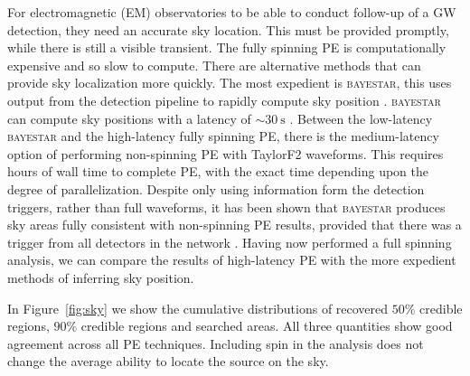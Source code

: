 For electromagnetic (EM) observatories to be able to conduct follow-up of a GW detection, they need an accurate sky location. This must be provided promptly, while there is still a visible transient. The fully spinning PE is computationally expensive and so slow to compute. There are alternative methods that can provide sky localization more quickly. The most expedient is \textsc{bayestar}, this uses output from the detection pipeline to rapidly compute sky position \citep{Singer_2014}. \textsc{bayestar} can compute sky positions with a latency of $\sim30~\mathrm{s}$ \citep{Berry_2014}. Between the low-latency \textsc{bayestar} and the high-latency fully spinning PE, there is the medium-latency option of performing non-spinning PE with TaylorF2 waveforms. This requires hours of wall time to complete PE, with the exact time depending upon the degree of parallelization. Despite only using information form the detection triggers, rather than full waveforms, it has been shown that \textsc{bayestar} produces sky areas fully consistent with non-spinning PE results, provided that there was a trigger from all detectors in the network \citep{Singer_2014,Berry_2014}. Having now performed a full spinning analysis, we can compare the results of high-latency PE with the more expedient methods of inferring sky position.

In Figure~\ref{fig:sky} we show the cumulative distributions of recovered $50\%$ credible regions, $90\%$ credible regions and searched areas. All three quantities show good agreement across all PE techniques. %
Including spin in the analysis does not change the average ability to locate the source on the sky.

  
  